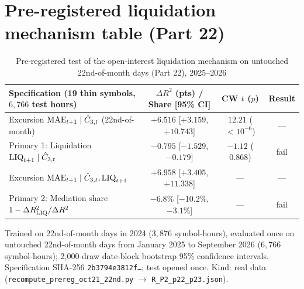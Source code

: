 \documentclass[12pt]{article}
\theoremstyle{definition}
\theoremstyle{remark}
\begin{document}
\section{Pre-registered liquidation mechanism table (Part 22)}
\FloatBarrier
\begin{table}[!tbp]\centering\footnotesize
\begin{threeparttable}
\caption{Pre-registered test of the open-interest liquidation mechanism on untouched 22nd-of-month days (Part 22), 2025--2026}\label{tab:p22}
\setlength{\tabcolsep}{1.8pt}
\begin{tabular}{lccc}
\toprule
Specification (19 thin symbols, $6{,}766$ test hours) & $\Delta R^2$ (pts) / Share [95\% CI] & CW $t$ ($p$) & Result\\
\midrule
Excursion ${\rm MAE}_{t+1}\mid\hat C_{3,t}$ (22nd-of-month) & $+6.516$ [$+3.159$, $+10.743$] & $12.21$ ($<10^{-6}$) & ---\\
Primary 1: Liquidation ${\rm LIQ}_{t+1}\mid\hat C_{3,t}$ & $-0.795$ [$-1.529$, $-0.179$] & $-1.12$ ($0.868$) & fail\\
Excursion ${\rm MAE}_{t+1}\mid\hat C_{3,t},{\rm LIQ}_{t+1}$ & $+6.958$ [$+3.405$, $+11.338$] & --- & ---\\
Primary 2: Mediation share $1-\Delta R^2_{\rm LIQ}/\Delta R^2$ & $-6.8\%$ [$-10.2\%$, $-3.1\%$] & --- & fail\\
\bottomrule
\end{tabular}
\begin{tablenotes}\footnotesize\item Trained on 22nd-of-month days in 2024 ($3{,}876$ symbol-hours), evaluated once on untouched 22nd-of-month days from January 2025 to September 2026 ($6{,}766$ symbol-hours); 2{,}000-draw date-block bootstrap 95\% confidence intervals. Specification SHA-256 \texttt{2b3794e3812f\ldots}; test opened once. Kind: real data (\texttt{recompute\_prereg\_oct21\_22nd.py} $\to$ \texttt{R\_P2\_p22\_p23.json}).\end{tablenotes}
\end{threeparttable}
\end{table}
\FloatBarrier
\end{document}
